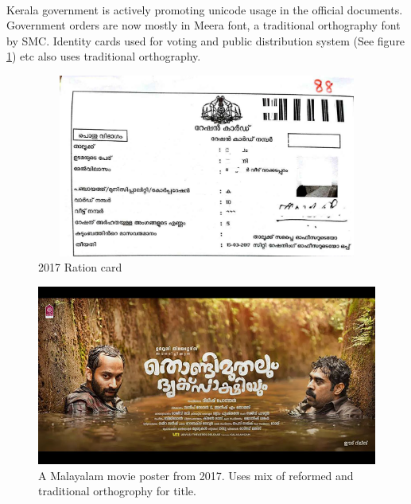 \documentclass[10pt]{article}
\begin{document}


\paragraph{}
Kerala government is actively promoting unicode usage in the official documents. Government orders are now mostly in Meera font, a traditional orthography font by SMC. Identity cards used for voting and public distribution system (See figure \ref{rationcard}) etc also uses traditional orthography.

\begin{figure}[H]
 \centering
  \includegraphics[width=1.0\textwidth,height=6cm ]{images/2017-rationcard.jpg}
   \caption{2017 Ration card}
  \label{rationcard}
\end{figure}


\begin{figure}[H]
 \centering
  \includegraphics[width=1.0\textwidth]{images/2017-movieposter-Thondimuthal}
 \caption{A Malayalam movie poster from 2017. Uses mix of reformed and traditional orthogrophy for title.}
\end{figure}
\end{document}
